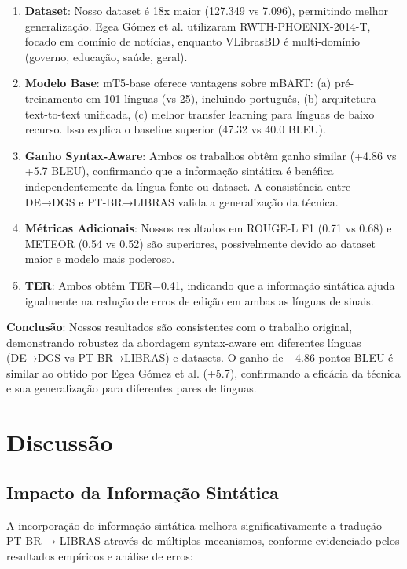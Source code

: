\documentclass[12pt]{article}
\begin{document}
\begin{enumerate}
\item \textbf{Dataset}: Nosso dataset é 18x maior (127.349 vs 7.096), permitindo melhor generalização. Egea Gómez et al. utilizaram RWTH-PHOENIX-2014-T, focado em domínio de notícias, enquanto VLibrasBD é multi-domínio (governo, educação, saúde, geral).

\item \textbf{Modelo Base}: mT5-base oferece vantagens sobre mBART: (a) pré-treinamento em 101 línguas (vs 25), incluindo português, (b) arquitetura text-to-text unificada, (c) melhor transfer learning para línguas de baixo recurso. Isso explica o baseline superior (47.32 vs 40.0 BLEU).

\item \textbf{Ganho Syntax-Aware}: Ambos os trabalhos obtêm ganho similar (+4.86 vs +5.7 BLEU), confirmando que a informação sintática é benéfica independentemente da língua fonte ou dataset. A consistência entre DE→DGS e PT-BR→LIBRAS valida a generalização da técnica.

\item \textbf{Métricas Adicionais}: Nossos resultados em ROUGE-L F1 (0.71 vs 0.68) e METEOR (0.54 vs 0.52) são superiores, possivelmente devido ao dataset maior e modelo mais poderoso.

\item \textbf{TER}: Ambos obtêm TER=0.41, indicando que a informação sintática ajuda igualmente na redução de erros de edição em ambas as línguas de sinais.
\end{enumerate}

\textbf{Conclusão}: Nossos resultados são consistentes com o trabalho original, demonstrando robustez da abordagem syntax-aware em diferentes línguas (DE→DGS vs PT-BR→LIBRAS) e datasets. O ganho de +4.86 pontos BLEU é similar ao obtido por Egea Gómez et al. (+5.7), confirmando a eficácia da técnica e sua generalização para diferentes pares de línguas.

\section{Discussão}

\subsection{Impacto da Informação Sintática}

A incorporação de informação sintática melhora significativamente a tradução PT-BR → LIBRAS através de múltiplos mecanismos, conforme evidenciado pelos resultados empíricos e análise de erros:
\end{document}
